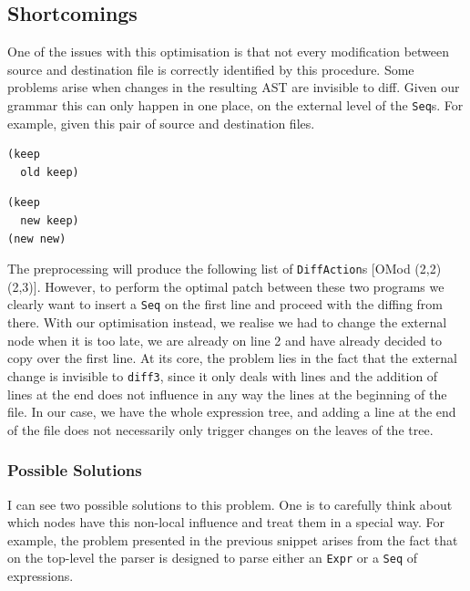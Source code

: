 \documentclass[11pt]{article}
\begin{document}
\subsection{Shortcomings}
One of the issues with this optimisation is that not every modification between 
source and destination file is correctly identified by this procedure. Some 
problems arise when changes in the resulting AST are invisible to diff. Given 
our grammar this can only happen in one place, on the external level of the 
\texttt{Seq}s. For example, given this pair of source and destination files.
\begin{lstlisting}[language=haskell]
(keep
  old keep)
\end{lstlisting}

\begin{lstlisting}[language=haskell]
(keep
  new keep)
(new new)
\end{lstlisting}

The preprocessing will produce the following list of \texttt{DiffAction}s [OMod (2,2) 
(2,3)]. However, to perform the optimal patch between these two programs we 
clearly want to insert a \texttt{Seq} on the first line and proceed with the 
diffing from there. With our optimisation instead, we realise we had to change 
the external node when it is too late, we are already on line 2 and have already 
decided to copy over the first line. 
At its core, the problem lies in the fact that the external change is invisible to 
\texttt{diff3}, since it only deals with lines and the addition of lines at the end does not influence in any way
the lines at the beginning of the file. In our case, we have the whole 
expression tree, and adding a line at the end of the file does not necessarily only trigger 
changes on the leaves of the tree.

\subsubsection{Possible Solutions}
I can see two possible solutions to this problem. One is to carefully think 
about which nodes have this non-local influence and treat them in a special way. 
For example, the problem presented in the previous snippet arises from the fact 
that on the top-level the parser is designed to parse either an \texttt{Expr} or 
a \texttt{Seq} of expressions. 
\end{document}

